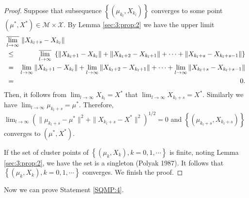 \begin{proof}
Suppose that subsequence $\left\{(\mu_{k_l},X_{k_l})\right\}$
converges to some point $(\mu^*,X^*)\in \mathcal{M}\times
\mathcal{X}$. By Lemma \ref{sec:3:prop:2} we have the upper limit
\begin{eqnarray*}
\lefteqn{\overline{\lim_{l\to\infty}}~ \|X_{k_l+s}-X_{k_l}\|}\\
&\le& \overline{\lim_{l\to \infty}}~ \left\{\|X_{k_l+1}-X_{k_l}\|
+\|X_{k_l+2}-X_{k_l+1}\|+\cdots+\|X_{k_l+s}-X_{k_l+s-1}\|\right\}\\
&=& \lim_{l\to \infty} \|X_{k_l+1}-X_{k_l}\|+\lim_{l\to \infty}
\|X_{k_l+2}-X_{k_l+1}\|+\cdots+\lim_{l\to \infty} \|X_{k_l+s}-
X_{k_l+s-1}\|\\
&=& 0.
\end{eqnarray*}
Then, it follows from $\lim_{l\to\infty} X_{k_l}=X^*$ that
$\lim_{l\to\infty} X_{k_l+s}=X^*$. Similarly we have
$\lim_{l\to\infty} \mu_{k_l+s}=\mu^*$. Therefore, $\lim_{l\to\infty}
(\|\mu_{k_l+s}-\mu^*\|^2+\|X_{k_l+s}-X^*\|^2)^{1/2}=0$ and
$\left\{(\mu_{k_l+s},X_{k_l+s})\right\}$ converges to $(\mu^*,X^*)$.

If the set of cluster points of $\left\{(\mu_k,X_k),
k=0,1,\cdots\right\}$ is finite, noting Lemma \ref{sec:3:prop:2}, we
have the set is a singleton (Polyak 1987). It follows that
$\left\{(\mu_k,X_k), k=0,1,\cdots\right\}$ converges. We finish the
proof.
\end{proof}

Now we can prove Statement \ref{SQMP:4}.

